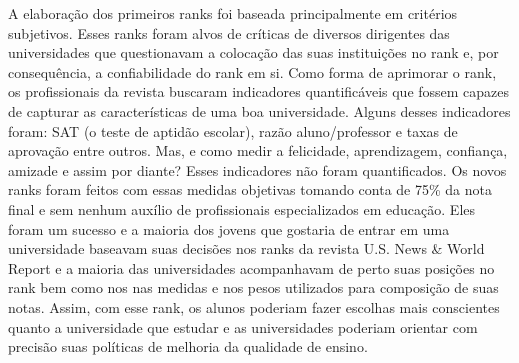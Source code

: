 \documentclass{article}
\begin{document}
A elaboração dos primeiros ranks foi baseada principalmente em critérios subjetivos. Esses ranks foram alvos de críticas de diversos dirigentes das universidades que questionavam a colocação das suas instituições no rank e, por consequência, a confiabilidade do rank em si. Como forma de aprimorar o rank, os profissionais da revista buscaram indicadores quantificáveis que fossem capazes de capturar as características de uma boa universidade. Alguns desses indicadores foram: SAT (o teste de aptidão escolar), razão aluno/professor e taxas de aprovação entre outros. Mas, e como medir a felicidade, aprendizagem, confiança, amizade e assim por diante? Esses indicadores não foram quantificados. Os novos ranks foram feitos com essas medidas objetivas tomando conta de 75\% da nota final e sem nenhum auxílio de profissionais especializados em educação. Eles foram um sucesso e a maioria dos jovens que gostaria de entrar em uma universidade baseavam suas decisões nos ranks da revista U.S. News \& World Report e a maioria das universidades acompanhavam de perto suas posições no rank bem como nos nas medidas e nos pesos utilizados para composição de suas notas. Assim, com esse rank, os alunos poderiam fazer escolhas mais conscientes quanto a universidade que estudar e as universidades poderiam orientar com precisão suas políticas de melhoria da qualidade de ensino.





\end{document}
